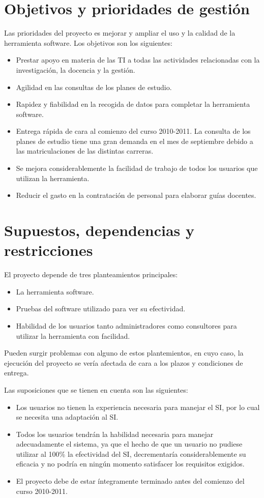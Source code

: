 \documentclass[11pt,a4paper,spanish,twoside]{report}
\begin{document}
\section{Objetivos y prioridades de gestión}
Las prioridades del proyecto es mejorar y ampliar el uso y la calidad de la
herramienta software. Los objetivos son los siguientes:
\begin{itemize}
\item Prestar apoyo en materia de las TI a todas las actividades relacionadas
  con la investigación, la docencia y la gestión.
\item Agilidad en las consultas de los planes de estudio.
\item Rapidez y fiabilidad en la recogida de datos para completar la
  herramienta software.
\item Entrega rápida de cara al comienzo del curso 2010-2011. La consulta de
  los planes de estudio tiene una gran demanda en el mes de septiembre debido
  a las matriculaciones de las distintas carreras.
\item Se mejora considerablemente la facilidad de trabajo de todos los
  usuarios que utilizan la herramienta.
\item Reducir el gasto en la contratación de personal para elaborar guías
  docentes. 
\end{itemize}

\section{Supuestos, dependencias y restricciones}
El proyecto depende de tres planteamientos principales:
\begin{itemize}
\item La herramienta software.
\item Pruebas del software utilizado para ver su efectividad.
\item Habilidad de los usuarios tanto administradores como consultores para
  utilizar la herramienta con facilidad.
\end{itemize}
Pueden surgir problemas con alguno de estos plantemientos, en cuyo caso, la
ejecución del proyecto se vería afectada de cara a los plazos y condiciones
de entrega.

Las suposiciones que se tienen en cuenta son las siguientes:
\begin{itemize}
\item Los usuarios no tienen la experiencia necesaria para manejar el SI, por
  lo cual se necesita una adaptación al SI. 
\item Todos los usuarios tendrán la habilidad necesaria para manejar
  adecuadamente el sistema, ya que el hecho de que un usuario no pudiese
  utilizar al 100\% la efectividad del SI, decrementaría considerablemente su
  eficacia y no podría en ningún momento satisfacer los requisitos exigidos.
\item El proyecto debe de estar íntegramente terminado antes del comienzo del
  curso 2010-2011.
\end{itemize}
\end{document}
